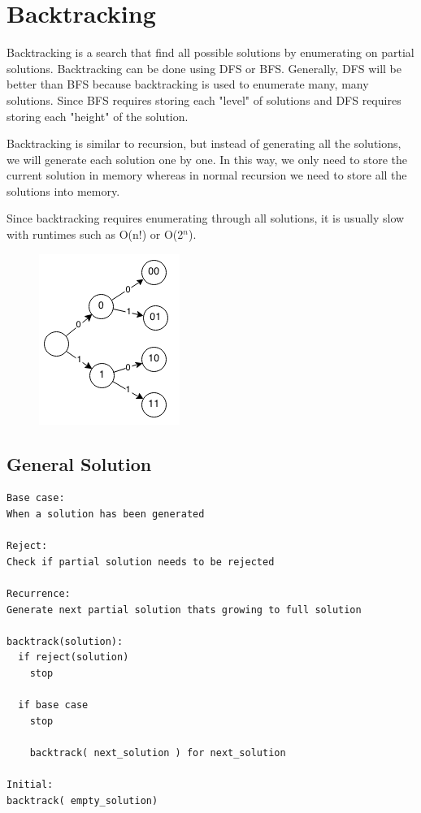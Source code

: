 \documentclass[11pt,oneside]{book}
\makeatletter
\def\maxwidth#1{\ifdim\Gin@nat@width>#1 #1\else\Gin@nat@width\fi}
\makeatother
\begin{document}
        \section{ Backtracking }
        

Backtracking is a search that find all possible solutions by enumerating on partial solutions. Backtracking can be done using DFS or BFS. Generally, DFS will be better than BFS because backtracking is used to enumerate many, many solutions. Since BFS requires storing each "level" of solutions and DFS requires storing each "height" of the solution.

Backtracking is similar to recursion, but instead of generating all the solutions, we will generate each solution one by one. In this way, we only need to store the current solution in memory whereas in normal recursion we need to store all the solutions into memory.

Since backtracking requires enumerating through all solutions, it is usually slow with runtimes such as O(n!) or O(2$^{n}$).

\vspace{5px}\begin{figure}[H]\centering
        \includegraphics[width=0.66\maxwidth{\textwidth}]{backtracking.png}
        \end{figure}

\subsection{General Solution}

\begin{lstlisting}
Base case:
When a solution has been generated

Reject:
Check if partial solution needs to be rejected

Recurrence:
Generate next partial solution thats growing to full solution

backtrack(solution):
  if reject(solution)
    stop

  if base case
    stop

    backtrack( next_solution ) for next_solution

Initial:
backtrack( empty_solution)
\end{lstlisting}
\end{document}
